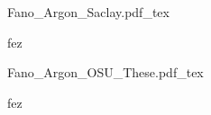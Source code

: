 \begin{figure}
\centering
\def\svgwidth{1\textwidth}
{Fano_Argon_Saclay.pdf_tex}
\caption{fez}
\label{fig:Phases_Argon_Saclay}
\end{figure}

\begin{figure}
\centering
\def\svgwidth{1\textwidth}
{Fano_Argon_OSU_These.pdf_tex}
\caption{fez}
\label{fig:Phases_Argon_OSU}
\end{figure}






